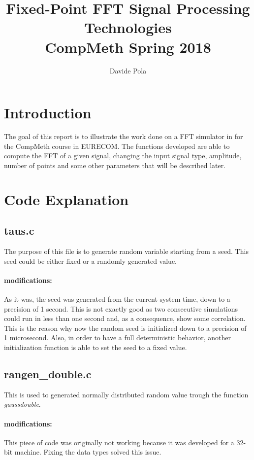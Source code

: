 \documentclass[a4paper]{article}
\title{\textbf{Fixed-Point FFT Signal Processing Technologies}\\CompMeth Spring 2018}
\author{Davide Pola}
\begin{document}
\maketitle

\section{Introduction}

The goal of this report is to illustrate the work done on a FFT simulator in for the CompMeth course in EURECOM.
The functions developed are able to compute the FFT of a given signal, changing the input signal type, amplitude, number of points and some other parameters that will be described later.

\section{Code Explanation}
\subsection{taus.c}
The purpose of this file is to generate random variable starting from a seed. This seed could be either fixed or a randomly generated value.
\paragraph{modifications:}
As it was, the seed was generated from the current system time, down to a precision of 1 second. This is not exactly good as two consecutive simulations could run in less than one second and, as a consequence, show some correlation. This is the reason why now the random seed is initialized down to a precision of 1 microsecond.
Also, in order to have a full deterministic behavior, another initialization function is able to set the seed to a fixed value.

\subsection{rangen\_double.c}
This is used to generated normally distributed random value trough the function \textit{gaussdouble}.
\paragraph{modifications:}
This piece of code was originally not working because it was developed for a 32-bit machine. Fixing the data types solved this issue.
\end{document}
